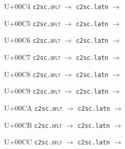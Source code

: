 \documentclass{article}
\begin{document}
\begin{substitutions}
\goodbreak

U+00C4  \linebreak
    \texttt{c2sc.\textsc{dflt}} $\to$  \linebreak
    \texttt{c2sc.latn} $\to$  

\goodbreak

U+00C5  \linebreak
    \texttt{c2sc.\textsc{dflt}} $\to$  \linebreak
    \texttt{c2sc.latn} $\to$  

\goodbreak

U+00C6  \linebreak
    \texttt{c2sc.\textsc{dflt}} $\to$  \linebreak
    \texttt{c2sc.latn} $\to$  

\goodbreak

U+00C7  \linebreak
    \texttt{c2sc.\textsc{dflt}} $\to$  \linebreak
    \texttt{c2sc.latn} $\to$  

\goodbreak

U+00C8  \linebreak
    \texttt{c2sc.\textsc{dflt}} $\to$  \linebreak
    \texttt{c2sc.latn} $\to$  

\goodbreak

U+00C9  \linebreak
    \texttt{c2sc.\textsc{dflt}} $\to$  \linebreak
    \texttt{c2sc.latn} $\to$  

\goodbreak

U+00CA  \linebreak
    \texttt{c2sc.\textsc{dflt}} $\to$  \linebreak
    \texttt{c2sc.latn} $\to$  

\goodbreak

U+00CB  \linebreak
    \texttt{c2sc.\textsc{dflt}} $\to$  \linebreak
    \texttt{c2sc.latn} $\to$  

\goodbreak

U+00CC  \linebreak
    \texttt{c2sc.\textsc{dflt}} $\to$  \linebreak
    \texttt{c2sc.latn} $\to$  


\end{substitutions}
\end{document}
